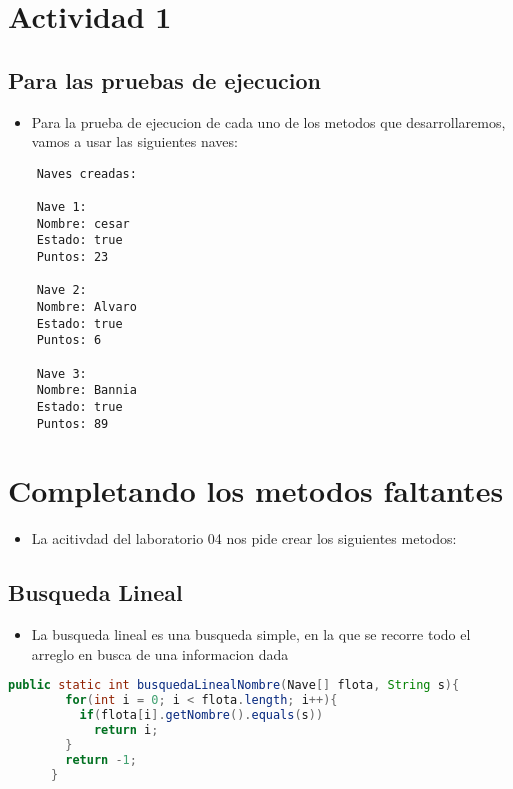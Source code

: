 












\section{Actividad 1}
\subsection{Para las pruebas de ejecucion}
\begin{itemize}
    \item Para la prueba de ejecucion de cada uno de los metodos que desarrollaremos, vamos a usar las siguientes naves:
\end{itemize}
\begin{lstlisting}
    Naves creadas:
    
    Nave 1:
    Nombre: cesar
    Estado: true
    Puntos: 23
    
    Nave 2:
    Nombre: Alvaro
    Estado: true
    Puntos: 6
    
    Nave 3:
    Nombre: Bannia
    Estado: true
    Puntos: 89
\end{lstlisting}

\section{Completando los metodos faltantes}
\begin{itemize}
    \item La acitivdad del laboratorio 04 nos pide crear los siguientes metodos:
\end{itemize}
\subsection{Busqueda Lineal}
\begin{itemize}
    \item La busqueda lineal es una busqueda simple, en la que se recorre todo el arreglo en busca de una informacion dada
\end{itemize}
\begin{lstlisting}[language=java, caption={Metodo de busqueda lineal}]
      public static int busquedaLinealNombre(Nave[] flota, String s){
        for(int i = 0; i < flota.length; i++){
          if(flota[i].getNombre().equals(s))
            return i;
        }
        return -1;
      } 
\end{lstlisting}

